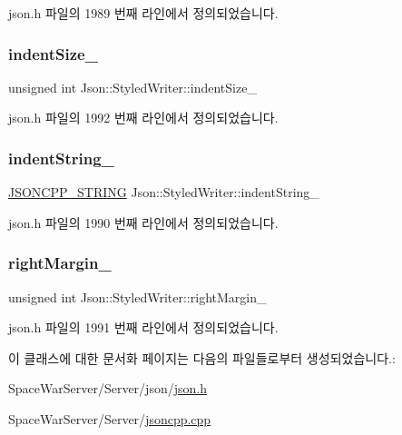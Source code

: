 json.\+h 파일의 1989 번째 라인에서 정의되었습니다.

\mbox{\label{class_json_1_1_styled_writer_a0b5ab768cc56433d463eb1f03da8614e}} 
\subsubsection{\texorpdfstring{indent\+Size\+\_\+}{indentSize\_}}
{\footnotesize\ttfamily unsigned int Json\+::\+Styled\+Writer\+::indent\+Size\+\_\+\hspace{0.3cm}{\ttfamily [private]}}



json.\+h 파일의 1992 번째 라인에서 정의되었습니다.

\mbox{\label{class_json_1_1_styled_writer_a7d91709c94c152bd44eaf80faac130ae}} 
\subsubsection{\texorpdfstring{indent\+String\+\_\+}{indentString\_}}
{\footnotesize\ttfamily \hyperlink{json_8h_a1e723f95759de062585bc4a8fd3fa4be}{J\+S\+O\+N\+C\+P\+P\+\_\+\+S\+T\+R\+I\+NG} Json\+::\+Styled\+Writer\+::indent\+String\+\_\+\hspace{0.3cm}{\ttfamily [private]}}



json.\+h 파일의 1990 번째 라인에서 정의되었습니다.

\mbox{\label{class_json_1_1_styled_writer_ae648d2e1fc0f7d45c748c96805106cb0}} 
\subsubsection{\texorpdfstring{right\+Margin\+\_\+}{rightMargin\_}}
{\footnotesize\ttfamily unsigned int Json\+::\+Styled\+Writer\+::right\+Margin\+\_\+\hspace{0.3cm}{\ttfamily [private]}}



json.\+h 파일의 1991 번째 라인에서 정의되었습니다.



이 클래스에 대한 문서화 페이지는 다음의 파일들로부터 생성되었습니다.\+:\begin{DoxyCompactItemize}
\item 
Space\+War\+Server/\+Server/json/\hyperlink{json_8h}{json.\+h}\item 
Space\+War\+Server/\+Server/\hyperlink{jsoncpp_8cpp}{jsoncpp.\+cpp}\end{DoxyCompactItemize}
